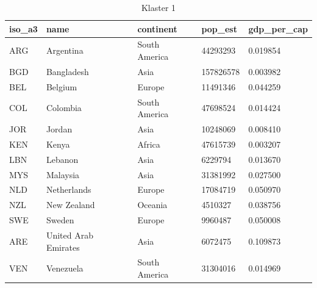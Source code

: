 \documentclass[11pt]{report}
\begin{document}
    \begin{table}[]
        \caption {Klaster 1} \label{tab:cl1}
        \begin{tabular}{lllll}
            \hline
            \multicolumn{1}{|l|}{iso\_a3} & \multicolumn{1}{l|}{name} & \multicolumn{1}{l|}{continent} & \multicolumn{1}{l|}{pop\_est} & \multicolumn{1}{l|}{gdp\_per\_cap} \\ \hline
            ARG                           & Argentina                 & South America                  & 44293293                      & 0.019854                           \\
            BGD                           & Bangladesh                & Asia                           & 157826578                     & 0.003982                           \\
            BEL                           & Belgium                   & Europe                         & 11491346                      & 0.044259                           \\
            COL                           & Colombia                  & South America                  & 47698524                      & 0.014424                           \\
            JOR                           & Jordan                    & Asia                           & 10248069                      & 0.008410                           \\
            KEN                           & Kenya                     & Africa                         & 47615739                      & 0.003207                           \\
            LBN                           & Lebanon                   & Asia                           & 6229794                       & 0.013670                           \\
            MYS                           & Malaysia                  & Asia                           & 31381992                      & 0.027500                           \\
            NLD                           & Netherlands               & Europe                         & 17084719                      & 0.050970                           \\
            NZL                           & New Zealand               & Oceania                        & 4510327                       & 0.038756                           \\
            SWE                           & Sweden                    & Europe                         & 9960487                       & 0.050008                           \\
            ARE                           & United Arab Emirates      & Asia                           & 6072475                       & 0.109873                           \\
            VEN                           & Venezuela                 & South America                  & 31304016                      & 0.014969
        \end{tabular}
    \end{table}
\end{document}
